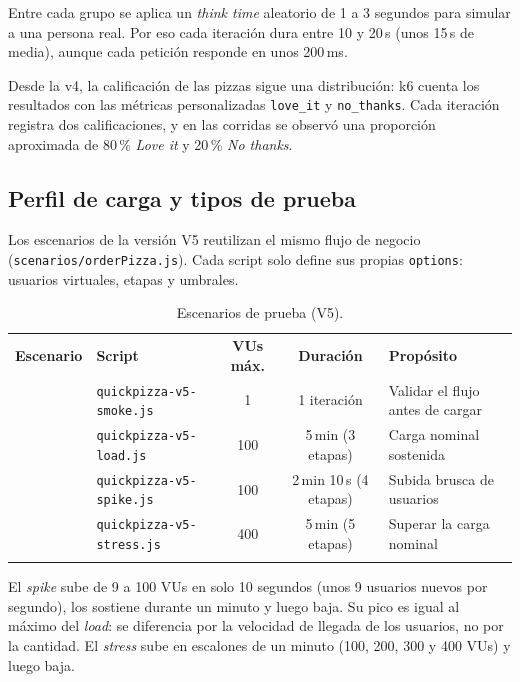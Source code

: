 \documentclass[11pt]{article}
\newcommand{\chip}[2]{\tcbox[on line, colback=#1, colframe=#1, arc=2pt, boxsep=0pt,
  left=4pt, right=4pt, top=1.5pt, bottom=1.5pt]{\sffamily\scriptsize\bfseries\color{white}#2}}
\newcommand{\esmoke}{\chip{gray!70}{SMOKE}}
\newcommand{\eload}{\chip{ucbazulclaro}{LOAD}}
\newcommand{\espike}{\chip{acento!90!black}{SPIKE}}
\newcommand{\estress}{\chip{red!65!black}{STRESS}}
\newcommand{\encab}[1]{{\leavevmode\color{white}\sffamily\bfseries #1}}
\renewcommand{\toprule}{\arrayrulecolor{ucbazul}\specialrule{0.8pt}{0pt}{0pt}\arrayrulecolor{black}}
\renewcommand{\midrule}{\arrayrulecolor{ucbazul}\specialrule{0.4pt}{0pt}{0pt}\arrayrulecolor{black}}
\renewcommand{\bottomrule}{\arrayrulecolor{acento}\specialrule{1.2pt}{0pt}{0pt}\arrayrulecolor{black}}
\begin{document}
Entre cada grupo se aplica un \emph{think time} aleatorio de 1 a 3 segundos para
simular a una persona real. Por eso cada iteración dura entre 10 y 20\,s
(unos 15\,s de media), aunque cada petición responde en unos 200\,ms.

Desde la v4, la calificación de las pizzas sigue una distribución: k6 cuenta los
resultados con las métricas personalizadas \texttt{love\_it} y \texttt{no\_thanks}.
Cada iteración registra dos calificaciones, y en las corridas se observó una
proporción aproximada de 80\,\% \emph{Love it} y 20\,\% \emph{No thanks}.

\subsection{Perfil de carga y tipos de prueba}

Los escenarios de la versión V5 reutilizan el mismo flujo de negocio
(\texttt{scenarios/\allowbreak orderPizza.js}). Cada script solo define sus propias
\texttt{options}: usuarios virtuales, etapas y umbrales.

\begin{table}[H]
\centering
\caption{Escenarios de prueba (V5).}
\begin{tabularx}{\textwidth}{l l c c >{\raggedright\arraybackslash}X}
\toprule
\rowcolor{ucbazul}
\encab{Escenario} & \encab{Script} & \encab{VUs máx.} & \encab{Duración} & \encab{Propósito} \\
\midrule
\esmoke  & \texttt{quickpizza-v5-smoke.js}  & 1   & 1 iteración          & Validar el flujo antes de cargar \\
\eload   & \texttt{quickpizza-v5-load.js}   & 100 & 5\,min (3 etapas)    & Carga nominal sostenida \\
\espike  & \texttt{quickpizza-v5-spike.js}  & 100 & 2\,min 10\,s (4 etapas) & Subida brusca de usuarios \\
\estress & \texttt{quickpizza-v5-stress.js} & 400 & 5\,min (5 etapas)    & Superar la carga nominal \\
\bottomrule
\end{tabularx}
\end{table}

El \emph{spike} sube de 9 a 100 VUs en solo 10 segundos (unos 9 usuarios nuevos por
segundo), los sostiene durante un minuto y luego baja. Su pico es igual al máximo
del \emph{load}: se diferencia por la velocidad de llegada de los usuarios, no por
la cantidad. El \emph{stress} sube en escalones de un minuto (100, 200, 300 y
400 VUs) y luego baja.
\end{document}
